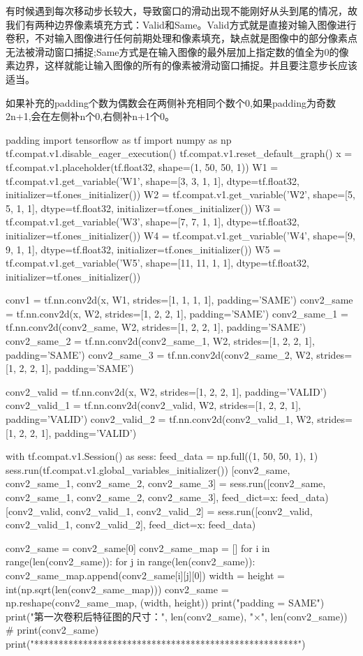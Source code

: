 \documentclass[openbib]{article}
\begin{document}
有时候遇到每次移动步长较大，导致窗口的滑动出现不能刚好从头到尾的情况，故我们有两种边界像素填充方式：Valid和Same。Valid方式就是直接对输入图像进行卷积，不对输入图像进行任何前期处理和像素填充，缺点就是图像中的部分像素点无法被滑动窗口捕捉;Same方式是在输入图像的最外层加上指定数的值全为0的像素边界，这样就能让输入图像的所有的像素被滑动窗口捕捉。并且要注意步长应该适当。

如果补充的padding个数为偶数会在两侧补充相同个数个0,如果padding为奇数2n+1,会在左侧补n个0,右侧补n+1个0。
\begin{Python}{padding}
import tensorflow as tf
import numpy as np
tf.compat.v1.disable_eager_execution()
tf.compat.v1.reset_default_graph()
x = tf.compat.v1.placeholder(tf.float32, shape=(1, 50, 50, 1))
W1 = tf.compat.v1.get_variable('W1', shape=[3, 3, 1, 1], dtype=tf.float32, initializer=tf.ones_initializer())
W2 = tf.compat.v1.get_variable('W2', shape=[5, 5, 1, 1], dtype=tf.float32, initializer=tf.ones_initializer())
W3 = tf.compat.v1.get_variable('W3', shape=[7, 7, 1, 1], dtype=tf.float32, initializer=tf.ones_initializer())
W4 = tf.compat.v1.get_variable('W4', shape=[9, 9, 1, 1], dtype=tf.float32, initializer=tf.ones_initializer())
W5 = tf.compat.v1.get_variable('W5', shape=[11, 11, 1, 1], dtype=tf.float32, initializer=tf.ones_initializer())

conv1 = tf.nn.conv2d(x, W1, strides=[1, 1, 1, 1], padding='SAME')
conv2_same = tf.nn.conv2d(x, W2, strides=[1, 2, 2, 1], padding='SAME')
conv2_same_1 = tf.nn.conv2d(conv2_same, W2, strides=[1, 2, 2, 1], padding='SAME')
conv2_same_2 = tf.nn.conv2d(conv2_same_1, W2, strides=[1, 2, 2, 1], padding='SAME')
conv2_same_3 = tf.nn.conv2d(conv2_same_2, W2, strides=[1, 2, 2, 1], padding='SAME')

conv2_valid = tf.nn.conv2d(x, W2, strides=[1, 2, 2, 1], padding='VALID')
conv2_valid_1 = tf.nn.conv2d(conv2_valid, W2, strides=[1, 2, 2, 1], padding='VALID')
conv2_valid_2 = tf.nn.conv2d(conv2_valid_1, W2, strides=[1, 2, 2, 1], padding='VALID')

with tf.compat.v1.Session() as sess:
	feed_data = np.full((1, 50, 50, 1), 1)
	sess.run(tf.compat.v1.global_variables_initializer())
	[conv2_same, conv2_same_1, conv2_same_2, conv2_same_3] = sess.run([conv2_same, conv2_same_1, conv2_same_2, conv2_same_3], feed_dict={x: feed_data})
	[conv2_valid, conv2_valid_1, conv2_valid_2] = sess.run([conv2_valid, conv2_valid_1, conv2_valid_2], feed_dict={x: feed_data})
	
	conv2_same = conv2_same[0]
	conv2_same_map = []
	for i in range(len(conv2_same)):
	for j in range(len(conv2_same)):
	conv2_same_map.append(conv2_same[i][j][0])
	width = height = int(np.sqrt(len(conv2_same_map)))
	conv2_same = np.reshape(conv2_same_map, (width, height))
	print("padding = SAME")
	print("第一次卷积后特征图的尺寸：", len(conv2_same), "×", len(conv2_same))
	#	print(conv2_same)
	print("******************************************************")
	

\end{Python}
\end{document}
